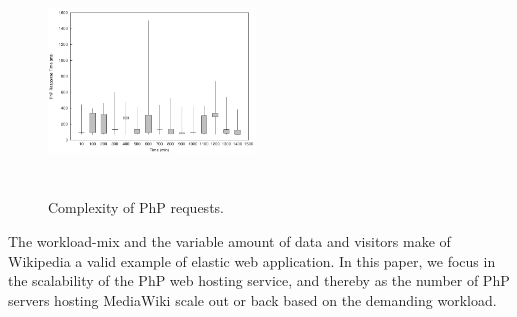 \begin{figure}
\begin{center}
\includegraphics[width=0.49\textwidth, height=6cm]{./images/phpRespTimeDispersion}
\end{center}
\caption{Complexity of PhP requests.}
\label{phpRespTimeDispersion}
\end{figure}








The workload-mix and the variable amount of data and visitors make of Wikipedia a valid example of elastic web application. In this paper, we focus in the scalability of the PhP web hosting service, and thereby as the number of PhP servers hosting MediaWiki scale out or back based on the demanding workload.

